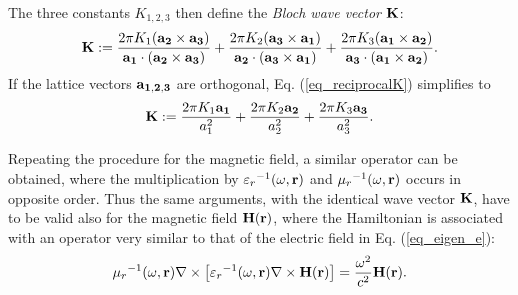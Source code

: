 The three constants $K_{1,2,3}$ then define the \textit{Bloch wave vector} ${\mathbf{K}}$: 
\begin{equation} {\mathbf{K}} := 
\frac{2\pi K_1({\mathbf{a_2}}\times{\mathbf{a_3}})}{{\mathbf{a_1}}\cdot({\mathbf{a_2}}\times{\mathbf{a_3}})} +  
\frac{2\pi K_2({\mathbf{a_3}}\times{\mathbf{a_1}})}{{\mathbf{a_2}}\cdot({\mathbf{a_3}}\times{\mathbf{a_1}})} +  
\frac{2\pi K_3({\mathbf{a_1}}\times{\mathbf{a_2}})}{{\mathbf{a_3}}\cdot({\mathbf{a_1}}\times{\mathbf{a_2}})}.
\label{eq_reciprocalK}\end{equation}
If the lattice vectors ${\mathbf{a_{1,2,3}}}$ are orthogonal, Eq. (\ref{eq_reciprocalK}) simplifies to
\begin{equation} {\mathbf{K}} := 
	\frac{2\pi K_1 {\mathbf{a_1}}}{a_1^{2}} +  
	\frac{2\pi K_2 {\mathbf{a_2}}}{a_2^{2}} +  
	\frac{2\pi K_3 {\mathbf{a_3}}}{a_3^{2}}.
\label{eq_reciprocalKorto}\end{equation}

Repeating the procedure for the magnetic field, a similar operator can be obtained, where the multiplication by ${\varepsilon_r}^{-1}(\omega,{\mathbf{r}})$ and ${\mu_r}^{-1 }(\omega,{\mathbf{r}})$ occurs in opposite order. Thus the same arguments, with the identical wave vector ${\mathbf{K}}$, have to be valid also for the magnetic field $\mathbf{H}({\mathbf{r}})$, where the Hamiltonian is associated with an operator very similar to that of the electric field in Eq. (\ref{eq_eigen_e}):
\begin{equation}
{\mu_r}^{-1 }(\omega,{\mathbf{r}}) \nabla\times \left[{\varepsilon_r}^{-1}(\omega,{\mathbf{r}}) \nabla\times \mathbf{H}({\mathbf{r}})\right] = \frac{\omega^2}{c^2}\mathbf{H}({\mathbf{r}}).   \label{eq_eigen_h}
\end{equation}

